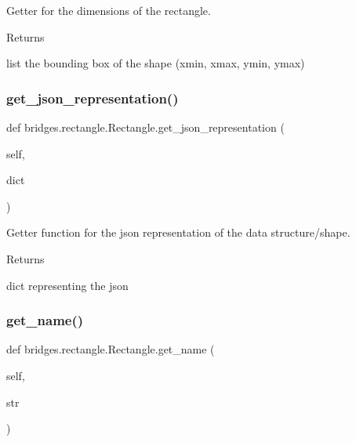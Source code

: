 Getter for the dimensions of the rectangle. 

\begin{DoxyReturn}{Returns}


list the bounding box of the shape (xmin, xmax, ymin, ymax) 
\end{DoxyReturn}
\mbox{\label{classbridges_1_1rectangle_1_1_rectangle_abed807aa2b797312357395f874577a64}} 
\subsubsection{\texorpdfstring{get\+\_\+json\+\_\+representation()}{get\_json\_representation()}}
{\footnotesize\ttfamily def bridges.\+rectangle.\+Rectangle.\+get\+\_\+json\+\_\+representation (\begin{DoxyParamCaption}\item[{}]{self,  }\item[{}]{dict }\end{DoxyParamCaption})}



Getter function for the json representation of the data structure/shape. 

\begin{DoxyReturn}{Returns}


dict representing the json 
\end{DoxyReturn}
\mbox{\label{classbridges_1_1rectangle_1_1_rectangle_aad74ee17feb376967249296d34dfcb74}} 
\subsubsection{\texorpdfstring{get\+\_\+name()}{get\_name()}}
{\footnotesize\ttfamily def bridges.\+rectangle.\+Rectangle.\+get\+\_\+name (\begin{DoxyParamCaption}\item[{}]{self,  }\item[{}]{str }\end{DoxyParamCaption})}



